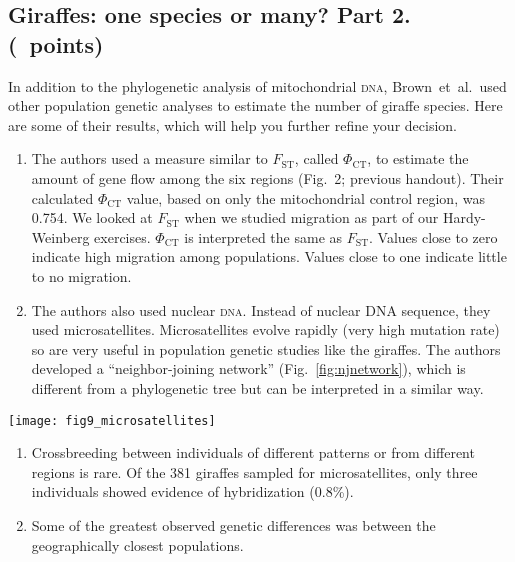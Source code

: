 \documentclass[11pt, addpoints]{exam}
\begin{document}
\subsection*{Giraffes: one species or many? Part 2. (\numpoints\ points)}

In addition to the phylogenetic analysis of mitochondrial \textsc{dna}, Brown~et~al.~used 
other population genetic analyses to estimate the number of
giraffe species. Here are some of their results, which will help you
further refine your decision.

\begin{enumerate}
\item
  The authors used a measure similar to $F_\mathrm{ST}$,
  called $\Phi_{\mathrm{CT}}$, to estimate the amount of gene flow among
  the six regions (Fig.~2; previous handout). Their calculated $\Phi_{\mathrm{CT}}$ value,
  based on only the mitochondrial control region, was 0.754. We looked
  at $F_\mathrm{ST}$ when we studied migration as part of our
  Hardy-Weinberg exercises. $\Phi_{\mathrm{CT}}$ is interpreted the same
  as $F_\mathrm{ST}$. Values close to zero indicate high
  migration among populations. Values close to one indicate little to no migration.
\item
  The authors also used nuclear \textsc{dna}. Instead of nuclear DNA sequence,
  they used microsatellites. Microsatellites evolve rapidly (very high
  mutation rate) so are very useful in population genetic studies like the
  giraffes. The authors developed a “neighbor-joining network” (Fig.~\ref{fig:njnetwork}), 
  which is different from a phylogenetic tree but can be interpreted
  in a similar way.
\end{enumerate}


\begin{center}
	\texttt{[image: fig9\_microsatellites]}
\end{center}


\begin{enumerate}
\item
  Crossbreeding between individuals of different patterns or from
  different regions is rare. Of the 381 giraffes sampled for
  microsatellites, only three individuals showed evidence of
  hybridization (0.8\%).
\item
  Some of the greatest observed genetic differences was between the geographically closest
  populations.
\end{enumerate}
\end{document}
